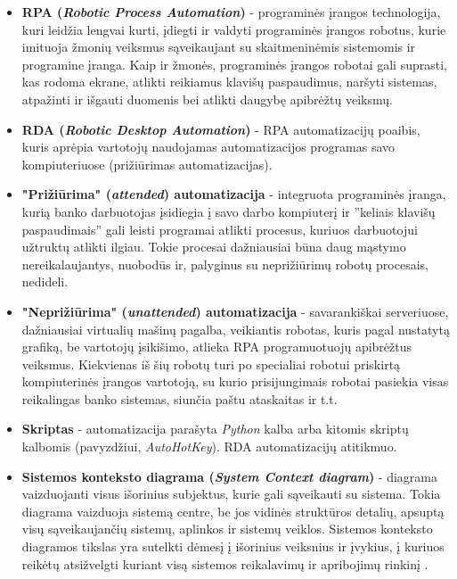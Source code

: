 \documentclass{VUMIFPSBakPrakAt}
\begin{document}
\begin{itemize}
    \item \textbf{RPA (\textit{Robotic Process Automation})} - programinės įrangos technologija, kuri leidžia lengvai kurti, įdiegti ir valdyti programinės įrangos robotus, kurie imituoja žmonių veiksmus sąveikaujant su skaitmeninėmis sistemomis ir programine įranga. Kaip ir žmonės, programinės įrangos robotai gali suprasti, kas rodoma ekrane, atlikti reikiamus klavišų paspaudimus, naršyti sistemas, atpažinti ir išgauti duomenis bei atlikti daugybę apibrėžtų veiksmų.
    \item \textbf{RDA (\textit{Robotic Desktop Automation})} - RPA automatizacijų poaibis, kuris aprėpia vartotojų naudojamas automatizacijos programas savo kompiuteriuose (prižiūrimas automatizacijas).
    \item \textbf{"Prižiūrima" (\textit{attended}) automatizacija} -  integruota programinės įranga, kurią banko darbuotojas įsidiegia į savo darbo kompiuterį ir ”keliais klavišų paspaudimais” gali leisti programai atlikti procesus, kuriuos darbuotojui užtruktų atlikti ilgiau. Tokie procesai dažniausiai būna daug mąstymo nereikalaujantys, nuobodūs ir, palyginus su neprižiūrimų robotų procesais, nedideli.
    \item \textbf{"Neprižiūrima" (\textit{unattended}) automatizacija} - savarankiškai serveriuose, dažniausiai virtualių mašinų pagalba, veikiantis robotas, kuris pagal nustatytą grafiką, be vartotojų įsikišimo, atlieka RPA programuotuojų apibrėžtus veiksmus. Kiekvienas iš šių robotų turi po specialiai robotui priskirtą kompiuterinės įrangos vartotoją, su kurio prisijungimais robotai pasiekia visas reikalingas banko sistemas, siunčia paštu ataskaitas ir t.t.
    \item \textbf{Skriptas} - automatizacija parašyta \textit{Python} kalba arba kitomis skriptų kalbomis (pavyzdžiui, \textit{AutoHotKey}). RDA automatizacijų atitikmuo.
    \item \textbf{Sistemos konteksto diagrama (\textit{System Context diagram})} - diagrama vaizduojanti visus išorinius subjektus, kurie gali sąveikauti su sistema. Tokia diagrama vaizduoja sistemą centre, be jos vidinės struktūros detalių, apsuptą visų sąveikaujančių sistemų, aplinkos ir sistemų veiklos. Sistemos konteksto diagramos tikslas yra sutelkti dėmesį į išorinius veiksnius ir įvykius, į kuriuos reikėtų atsižvelgti kuriant visą sistemos reikalavimų ir apribojimų rinkinį \cite{SystemContextDiagrams}.

\end{itemize}
\end{document}
